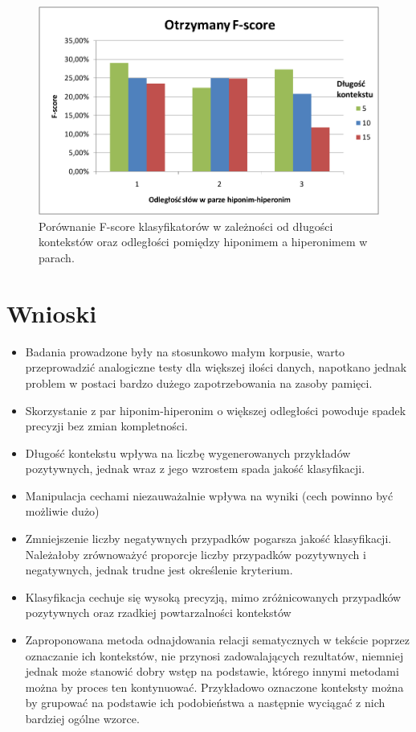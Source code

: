 \documentclass[a4paper,10pt]{report}
\begin{document}
\begin{figure}[h]
\centering
 \includegraphics[width=13cm]{img/image001.png}
 \caption{Porównanie F-score klasyfikatorów w zależności od długości kontekstów oraz odległości pomiędzy hiponimem a hiperonimem w parach.}
\label{fig:wykres}
\end{figure} 

\section{Wnioski}


\begin{itemize}
\item Badania prowadzone były na stosunkowo małym korpusie, warto przeprowadzić analogiczne testy dla większej ilości danych,
napotkano jednak problem w postaci bardzo dużego zapotrzebowania na zasoby pamięci.  

\item Skorzystanie z par hiponim-hiperonim o większej odległości powoduje spadek precyzji bez zmian kompletności.

\item Długość kontekstu wpływa na liczbę wygenerowanych przykładów pozytywnych, jednak wraz z jego wzrostem spada jakość klasyfikacji.

\item Manipulacja cechami niezauważalnie wpływa na wyniki (cech powinno być możliwie dużo)

\item Zmniejszenie liczby negatywnych przypadków pogarsza jakość klasyfikacji. Należałoby zrównoważyć proporcje liczby przypadków pozytywnych i negatywnych, jednak trudne jest określenie kryterium.

\item Klasyfikacja cechuje się wysoką precyzją, mimo zróżnicowanych przypadków pozytywnych oraz rzadkiej powtarzalności kontekstów

\item Zaproponowana metoda odnajdowania relacji sematycznych w tekście poprzez oznaczanie ich kontekstów, nie przynosi zadowalających rezultatów, niemniej jednak może stanowić dobry wstęp na podstawie, którego innymi metodami można by proces ten kontynuować. Przykładowo oznaczone konteksty można by grupować na podstawie ich podobieństwa a następnie wyciągać z nich bardziej ogólne wzorce.

\end{itemize}


\nocite{*}

\end{document}
